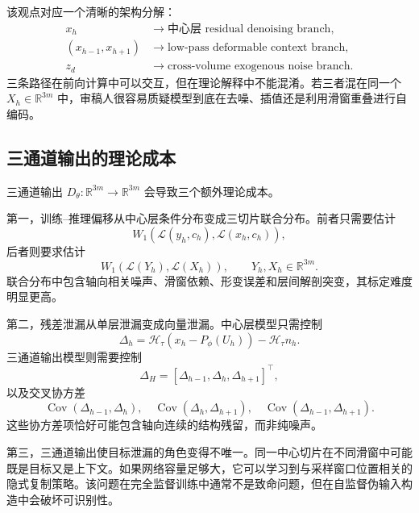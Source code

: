 \documentclass[11pt,a4paper,UTF8,fontset=fandol]{ctexart}
\theoremstyle{definition}
\DeclareMathOperator{\Cov}{Cov}
\newcommand{\R}{\mathbb{R}}
\newcommand{\cH}{\mathcal{H}}
\begin{document}
该观点对应一个清晰的架构分解：
\begin{equation}
\begin{aligned}
    x_h &\longrightarrow \text{中心层 residual denoising branch},\\
    (x_{h-1},x_{h+1}) &\longrightarrow \text{low-pass deformable context branch},\\
    z_d &\longrightarrow \text{cross-volume exogenous noise branch}.
\end{aligned}
\end{equation}
三条路径在前向计算中可以交互，但在理论解释中不能混淆。若三者混在同一个 $X_h\in\R^{3m}$ 中，审稿人很容易质疑模型到底在去噪、插值还是利用滑窗重叠进行自编码。

\subsection{三通道输出的理论成本}

三通道输出 $D_\theta:\R^{3m}\to\R^{3m}$ 会导致三个额外理论成本。

第一，训练--推理偏移从中心层条件分布变成三切片联合分布。前者只需要估计
\begin{equation}
    W_1(\mathcal L(y_h,c_h),\mathcal L(x_h,c_h)),
\end{equation}
后者则要求估计
\begin{equation}
    W_1(\mathcal L(Y_h),\mathcal L(X_h)),
    \qquad
    Y_h,X_h\in\R^{3m}.
\end{equation}
联合分布中包含轴向相关噪声、滑窗依赖、形变误差和层间解剖突变，其标定难度明显更高。

第二，残差泄漏从单层泄漏变成向量泄漏。中心层模型只需控制
\begin{equation}
    \Delta_h=\cH_\tau(x_h-P_\phi(U_h))-\cH_\tau n_h.
\end{equation}
三通道输出模型则需要控制
\begin{equation}
    \Delta_H=[\Delta_{h-1},\Delta_h,\Delta_{h+1}]^\top,
\end{equation}
以及交叉协方差
\begin{equation}
    \Cov(\Delta_{h-1},\Delta_h),
    \quad
    \Cov(\Delta_h,\Delta_{h+1}),
    \quad
    \Cov(\Delta_{h-1},\Delta_{h+1}).
\end{equation}
这些协方差项恰好可能包含轴向连续的结构残留，而非纯噪声。

第三，三通道输出使目标泄漏的角色变得不唯一。同一中心切片在不同滑窗中可能既是目标又是上下文。如果网络容量足够大，它可以学习到与采样窗口位置相关的隐式复制策略。该问题在完全监督训练中通常不是致命问题，但在自监督伪输入构造中会破坏可识别性。
\end{document}

